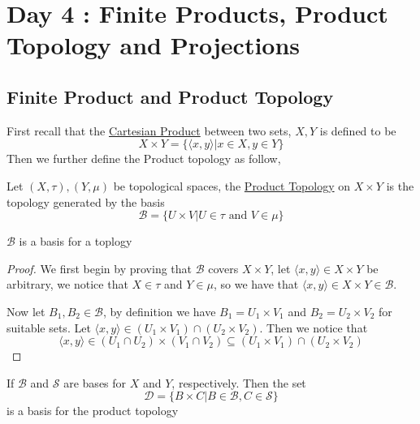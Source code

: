 \section{Day 4 : Finite Products, Product Topology and Projections}
\subsection{Finite Product and Product Topology}
First recall that the \href{https://en.wikipedia.org/wiki/Cartesian_product}{Cartesian Product} between two sets, $X,Y$ is defined to be
\[X\times Y=\{\langle x,y\rangle\vert x\in X,y\in Y\}\]
Then we further define the Product topology as follow,
\begin{definition}
    Let $(X,\tau),(Y,\mu)$ be topological spaces, the \href{https://en.wikipedia.org/wiki/Product_topology}{Product Topology} on $X\times Y$ is the topology generated by the basis
    \[\mathscr{B}=\{U\times V\vert U\in\tau\text{ and } V\in\mu\}\]    
\end{definition}
\begin{proposition}
    $\mathscr{B}$ is a basis for a toplogy
\end{proposition}
\begin{proof}
    We first begin by proving that $\mathscr{B}$ covers $X\times Y$, let $\langle x,y\rangle\in X\times Y$ be arbitrary, we notice that $X\in\tau$ and $Y\in\mu$, so we have that $\langle x,y\rangle\in X\times Y\in\mathscr{B}$.

    Now let $B_1,B_2\in\mathscr{B}$, by definition we have $B_1=U_1\times V_1$ and $B_2 = U_2\times V_2$ for suitable sets. Let $\langle x,y\rangle\in(U_1\times V_1)\cap(U_2\times V_2)$. Then we notice that 
    \[\langle x,y\rangle\in(U_1\cap U_2)\times(V_1\cap V_2)\subseteq (U_1\times V_1)\cap(U_2\times V_2)\]
\end{proof}
\begin{theorem}
    If $\mathscr{B}$ and $\mathscr{S}$ are bases for $X$ and $Y$, respectively. Then the set 
    \[\mathscr{D} = \{B\times C\vert B\in\mathscr{B},C\in\mathscr{S}\}\]
    is a basis for the product topology
\end{theorem}
